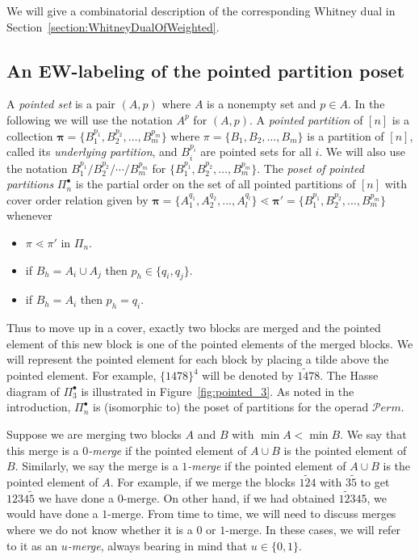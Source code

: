 \documentclass[11pt]{article}
\theoremstyle{definition}
\numberwithin{equation}{section}
\newcommand{\Perm}{\mathcal{P}erm}
\newcommand{\bpi}{\pmb{\pi}}
\begin{document}
We will give a combinatorial description of the corresponding Whitney dual in Section~\ref{section:WhitneyDualOfWeighted}.

\subsection{An EW-labeling of the pointed partition poset}\label{sec:EWLabOfPointPart}

A \emph{pointed set} is a pair $(A,p)$ where $A$ is a nonempty set and $p\in A$. In the following we will use the notation $A^p$ for   $(A,p)$.  A \textit{pointed partition} of $[n]$ is a collection $\bpi=\{B_1^{p_1},B_2^{p_2},\dots,B_m^{p_m}\}$ where $\pi=\{B_1,B_2,\dots,B_m\}$ is a partition of $[n]$, called its \emph{underlying partition}, and $B_i^{p_i}$ are pointed sets for all $i$.
We will also use the notation $B_1^{p_1}/B_2^{p_2}/\cdots/ B_m^{p_m}$ for $ \{B_1^{p_1},B_2^{p_2},\dots,B_m^{p_m}\}$. The \emph{poset of pointed partitions} $\Pi_{n}^{\bullet}$ is the partial order on the set of all pointed partitions of $[n]$ with cover order relation given by $\bpi=\{A_1^{q_1},A_2^{q_2},...,A_l^{q_l}\}\lessdot \bpi'=\{B_1^{p_1},B_2^{p_2},...,B_m^{p_m}\}$   whenever

\begin{itemize}
  \item $\pi\lessdot \pi'$ in $\Pi_n$.
  \item if $B_h=A_i\cup A_j$ then $p_h \in \{q_i,q_j\}$.
  \item if $B_h=A_i$ then $p_h=q_i$.
\end{itemize}
Thus to move up in a cover, exactly two blocks are merged and the pointed element of this new block is one of the pointed elements of the merged blocks.  We will represent the pointed element for each block by placing a tilde above the pointed element. For example, $\{1478\}^4$ will be denoted by $1\tilde{4}78$. The Hasse diagram of $\Pi_3^{\bullet}$ is illustrated in Figure~\ref{fig:pointed_3}. As noted in the introduction,  $\Pi_n^\bullet$ is (isomorphic to) the poset of partitions for the operad  $\Perm$.

Suppose we are merging two blocks $A$ and $B$ with $\min A< \min B$. We say that this merge is a  \emph{$0$-merge} if the pointed element of $A\cup B$ is the pointed element of~$B$. Similarly, we say the merge is a \emph{$1$-merge} if the pointed element of $A\cup B$ is the pointed element of $A$.  For example, if we merge the blocks $1\tilde{2}4$ with $3\tilde{5}$ to get $1234\tilde{5}$ we have done a $0$-merge.  On other hand, if we had obtained $1\tilde{2}345$, we would have done a $1$-merge.  From time to time, we will need to discuss merges where we do not know whether it is a $0$ or $1$-merge. In these cases, we will refer to it as an \emph{$u$-merge}, always bearing in mind that $u\in \{0,1\}$.   
\end{document}
